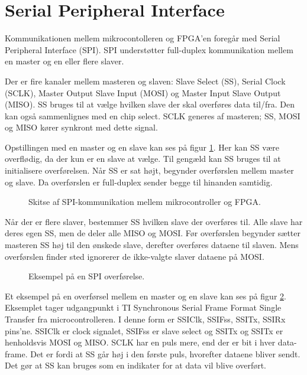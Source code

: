 \section{Serial Peripheral Interface}
\label{app:spi}
Kommunikationen mellem mikrocontolleren og FPGA’en foregår med Serial Peripheral Interface (SPI). 
SPI understøtter full-duplex kommunikation mellem en master og en eller flere slaver.

Der er fire kanaler mellem masteren og slaven: Slave Select (SS), Serial Clock (SCLK), Master Output Slave Input (MOSI) og Master Input Slave Output (MISO). SS bruges til at vælge hvilken slave der skal overføres data til/fra. Den kan også sammenlignes med en chip select. SCLK generes af masteren; SS, MOSI og MISO kører synkront med dette signal.

Opstillingen med en master og en slave kan ses på figur \ref{fig:SPImasterslave}. 
Her kan SS være overflødig, da der kun er en slave at vælge. Til gengæld kan SS bruges til at initialisere overførelsen. 
Når SS er sat højt, begynder overførslen mellem master og slave. Da overførslen er full-duplex sender begge til hinanden samtidig. 
\begin{figure}[!th]
\centering
\begin{tikzpicture}[scale=0.8]

\end{tikzpicture}
\caption[SPI protokol]{Skitse af SPI-kommunikation mellem mikrocontroller og FPGA.}
\label{fig:SPImasterslave}
\end{figure}

Når der er flere slaver, bestemmer SS hvilken slave der overføres til.
Alle slave har deres egen SS, men de deler alle MISO og MOSI. 
Før overførslen begynder sætter masteren SS høj til den ønskede slave,
derefter overføres dataene til slaven.
Mens overførslen finder sted ignorerer de ikke-valgte slaver dataene på MOSI.  

\begin{figure}[!th]
\centering
\begin{tikzpicture}[scale=0.8]

\end{tikzpicture}
\caption[SPI overførelse]{Eksempel på en SPI overførelse.}
\label{fig:SPIfigur}
\end{figure}

Et eksempel på en overførsel mellem en master og en slave kan ses på figur \ref{fig:SPIfigur}. 
Eksemplet tager udgangpunkt i TI Synchronous Serial Frame Format Single Transfer \cite[s. 476]{lm3s6965} fra microcontrolleren.
I denne form er SSIClk, SSIFss, SSITx, SSIRx pins'ne. SSIClk er clock signalet, SSIFss er slave select og SSITx og SSITx er henholdsvis MOSI og MISO.
SCLK har en puls mere, end der er bit i hver data-frame. Det er fordi at SS går høj i den første puls, hvorefter dataene bliver sendt. 
Det gør at SS kan bruges som en indikater for at data vil blive overført.
